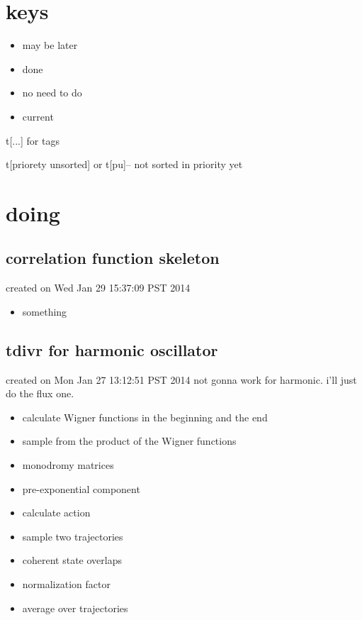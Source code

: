 \documentclass{article}
\let\Item\item
\renewcommand\item{\normalcolor\Item}
\newcommand\ml{\color[RGB]{153, 150, 204}} %
\newcommand\nn{\color[RGB]{124, 124, 255}} %
\newcommand\done{\color[RGB]{129, 180, 185} \ding{52} }
\newcommand\now{\color[RGB]{255, 0, 0}} %
\begin{document}
\section{keys}
\begin{itemize}
  \item \ml may be later
  \item \done done
  \item \nn no need to do
  \item \now current 
\end{itemize}

t[...] for tags

t[priorety unsorted] or t[pu]-- not sorted in priority yet

\section{doing}
\subsection{correlation function skeleton}
created on Wed Jan 29 15:37:09 PST 2014
\label{sub:correlation_function_skeleton}
\begin{itemize}
  \item something
\end{itemize}
\subsection{tdivr for harmonic oscillator}
created on Mon Jan 27 13:12:51 PST 2014
\label{sub:tdivr_for_harmonic_oscillator}
not gonna work for harmonic. i'll just do the flux one.
\begin{itemize}
  \item \now calculate Wigner functions in the beginning and the end
  \item sample from the product of the Wigner functions
  \item monodromy matrices
  \item pre-exponential component
  \item calculate action
  \item sample two trajectories
  \item coherent state overlaps
  \item normalization factor
  \item average over trajectories
\end{itemize}
\end{document}
